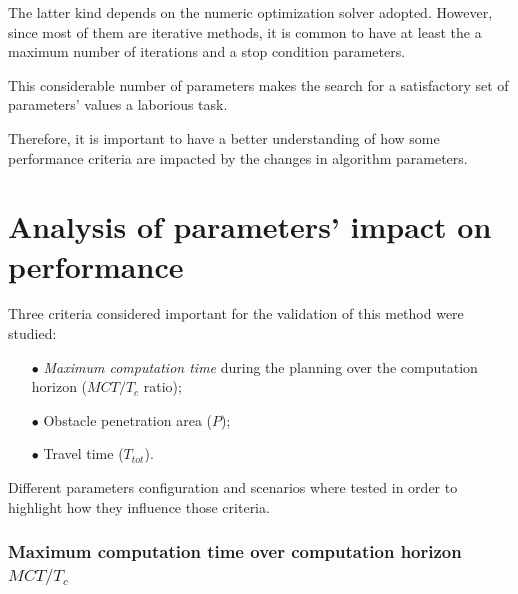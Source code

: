 The latter kind depends on the numeric optimization solver adopted.
However, since most of them are iterative methods, it is common
to have at least the a maximum number of iterations and a stop condition parameters.


This considerable number of parameters
makes the search for a
satisfactory set of parameters' values a laborious task.

Therefore, it is important to have a better understanding of how some
performance criteria are impacted by the changes in algorithm
parameters.

\section{Analysis of parameters' impact on performance}

Three criteria considered important for the validation of this method were studied:
\begin{itemize}
\item [$\bullet$] \textit{Maximum computation time} during the planning over the computation horizon ($MCT/T_c$ 
ratio);
\item [$\bullet$] Obstacle penetration area ($P$);
\item [$\bullet$] Travel time ($T_{tot}$).
\end{itemize}

Different parameters configuration and scenarios where tested in order to highlight
how they influence those criteria.
%
%
%
%
%

\subsubsection{Maximum computation time over computation horizon $MCT/T_c$}

